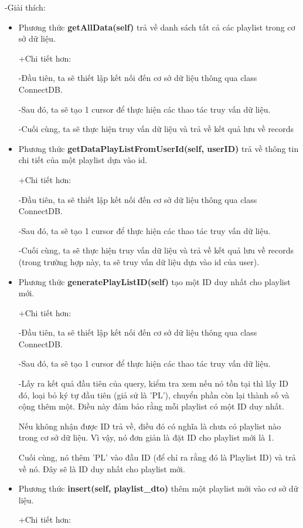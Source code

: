 \documentclass[a4paper]{article}
\begin{document}
\begin{flushleft}
	-Giải thích:
	\begin{itemize}
		\item Phương thức \textbf{getAllData(self)} trả về danh sách tất cả các playlist trong cơ sở dữ liệu.
		      \begin{flushleft}
			      +Chi tiết hơn:

			      -Đầu tiên, ta sẽ thiết lập kết nối đến cơ sở dữ liệu thông qua class ConnectDB.

			      -Sau đó, ta sẽ tạo 1 cursor để thực hiện các thao tác truy vấn dữ liệu.

			      -Cuối cùng, ta sẽ thực hiện truy vấn dữ liệu và trả về kết quả lưu về records
		      \end{flushleft}
		\item Phương thức \textbf{getDataPlayListFromUserId(self, userID)} trả về thông tin chi tiết của một playlist dựa vào id.
		      \begin{flushleft}
			      +Chi tiết hơn:

			      -Đầu tiên, ta sẽ thiết lập kết nối đến cơ sở dữ liệu thông qua class ConnectDB.

			      -Sau đó, ta sẽ tạo 1 cursor để thực hiện các thao tác truy vấn dữ liệu.

			      -Cuối cùng, ta sẽ thực hiện truy vấn dữ liệu và trả về kết quả lưu về records (trong trường hợp này, ta sẽ truy vấn dữ liệu dựa vào id của user).
		      \end{flushleft}
		\item Phương thức \textbf{generatePlayListID(self)} tạo một ID duy nhất cho playlist mới.
		      \begin{flushleft}
			      +Chi tiết hơn:

			      -Đầu tiên, ta sẽ thiết lập kết nối đến cơ sở dữ liệu thông qua class ConnectDB.

			      -Sau đó, ta sẽ tạo 1 cursor để thực hiện các thao tác truy vấn dữ liệu.

			      -Lấy ra kết quả đầu tiên của query, kiểm tra xem nếu nó tồn tại thì
			      lấy ID đó, loại bỏ ký tự đầu tiên (giả sử là 'PL'), chuyển phần còn lại thành số và cộng thêm một.
			      Điều này đảm bảo rằng mỗi playlist có một ID duy nhất.

			      Nếu không nhận được ID trả về, điều đó có nghĩa là chưa có playlist nào trong cơ sở dữ liệu.
			      Vì vậy, nó đơn giản là đặt ID cho playlist mới là 1.

			      Cuối cùng, nó thêm 'PL' vào đầu ID (để chỉ ra rằng đó là Playlist ID) và trả về nó.
			      Đây sẽ là ID duy nhất cho playlist mới.
		      \end{flushleft}
		\item Phương thức \textbf{insert(self, playlist\_dto)} thêm một playlist mới vào cơ sở dữ liệu.
		      \begin{flushleft}
			      +Chi tiết hơn:


\end{flushleft}
\end{itemize}
\end{flushleft}
\end{document}
